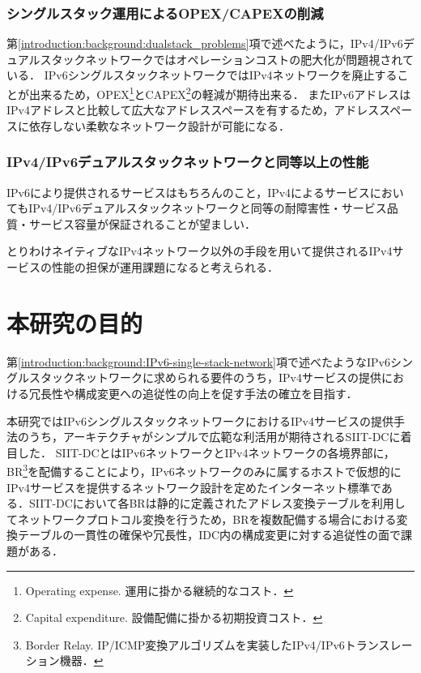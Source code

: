 \subsubsection{シングルスタック運用によるOPEX/CAPEXの削減}
第\ref{introduction:background:dualstack_problems}項で述べたように，IPv4/IPv6デュアルスタックネットワークではオペレーションコストの肥大化が問題視されている．
IPv6シングルスタックネットワークではIPv4ネットワークを廃止することが出来るため，OPEX\footnote{Operating expense. 運用に掛かる継続的なコスト．}とCAPEX\footnote{Capital expenditure. 設備配備に掛かる初期投資コスト．}の軽減が期待出来る．
またIPv6アドレスはIPv4アドレスと比較して広大なアドレススペースを有するため，アドレススペースに依存しない柔軟なネットワーク設計が可能になる．

\subsubsection{IPv4/IPv6デュアルスタックネットワークと同等以上の性能}
IPv6により提供されるサービスはもちろんのこと，IPv4によるサービスにおいてもIPv4/IPv6デュアルスタックネットワークと同等の耐障害性・サービス品質・サービス容量が保証されることが望ましい．

とりわけネイティブなIPv4ネットワーク以外の手段を用いて提供されるIPv4サービスの性能の担保が運用課題になると考えられる．




\section{本研究の目的}
第\ref{introduction:background:IPv6-single-stack-network}項で述べたようなIPv6シングルスタックネットワークに求められる要件のうち，IPv4サービスの提供における冗長性や構成変更への追従性の向上を促す手法の確立を目指す．

本研究ではIPv6シングルスタックネットワークにおけるIPv4サービスの提供手法のうち，アーキテクチャがシンプルで広範な利活用が期待されるSIIT-DC\cite{RFC7755}に着目した．
SIIT-DCとはIPv6ネットワークとIPv4ネットワークの各境界部に，BR\footnote{Border Relay. IP/ICMP変換アルゴリズム\cite{RFC7915}を実装したIPv4/IPv6トランスレーション機器．}を配備することにより，IPv6ネットワークのみに属するホストで仮想的にIPv4サービスを提供するネットワーク設計を定めたインターネット標準である．SIIT-DCにおいて各BRは静的に定義されたアドレス変換テーブルを利用してネットワークプロトコル変換を行うため，BRを複数配備する場合における変換テーブルの一貫性の確保や冗長性，IDC内の構成変更に対する追従性の面で課題がある．


